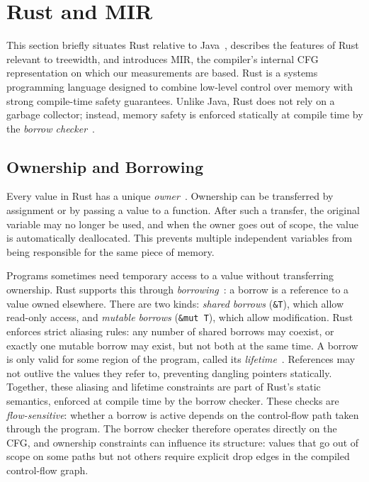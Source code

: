 \section{Rust and MIR}
\label{sec:rust-and-mir}

This section briefly situates Rust relative to Java~\cite{gustedt_2002}, describes the features of Rust relevant to treewidth, and introduces MIR, the compiler's internal CFG representation on which our measurements are based.
Rust is a systems programming language designed to combine low-level control over memory with strong compile-time safety guarantees.
Unlike Java, Rust does not rely on a garbage collector; instead, memory safety is enforced statically at compile time by the \emph{borrow checker}~\cite[Ch.~4.2]{rust_book}.

\subsection{Ownership and Borrowing}
\label{subsec:ownership-borrowing}

Every value in Rust has a unique \emph{owner}~\cite[Ch.~4.1]{rust_book}.
Ownership can be transferred by assignment or by passing a value to a function.
After such a transfer, the original variable may no longer be used, and when the owner goes out of scope, the value is automatically deallocated.
This prevents multiple independent variables from being responsible for the same piece of memory.

Programs sometimes need temporary access to a value without transferring ownership.
Rust supports this through \emph{borrowing}~\cite[Ch.~4.2]{rust_book}: a borrow is a reference to a value owned elsewhere.
There are two kinds: \emph{shared borrows} (\texttt{\&T}), which allow read-only access, and \emph{mutable borrows} (\texttt{\&mut T}), which allow modification.
Rust enforces strict aliasing rules: any number of shared borrows may coexist, or exactly one mutable borrow may exist, but not both at the same time.
A borrow is only valid for some region of the program, called its \emph{lifetime}~\cite[Ch.~10.3]{rust_book}.
References may not outlive the values they refer to, preventing dangling pointers statically.
Together, these aliasing and lifetime constraints are part of Rust's static semantics, enforced at compile time by the borrow checker.
These checks are \emph{flow-sensitive}: whether a borrow is active depends on the control-flow path taken through the program.
The borrow checker therefore operates directly on the CFG, and ownership constraints can influence its structure: values that go out of scope on some paths but not others require explicit drop edges in the compiled control-flow graph.

